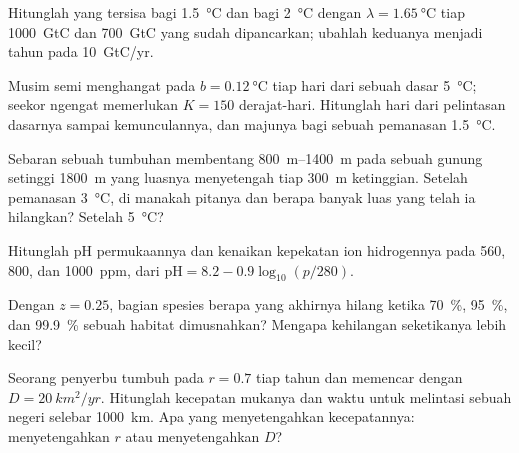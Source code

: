 \begin{exercise}[$\star\star$]\label{exo:b2:global-change:5}
Hitunglah  yang tersisa bagi \qty{1.5}{\celsius} dan
bagi \qty{2}{\celsius} dengan $\lambda = \qty{1.65}{\celsius}$ tiap
\qty{1000}{GtC} dan \qty{700}{GtC} yang sudah dipancarkan; ubahlah
keduanya menjadi tahun pada \qty{10}{GtC/yr}.
\end{exercise}

\begin{exercise}[$\star\star$]\label{exo:b2:global-change:6}
Musim semi menghangat pada $b = \qty{0.12}{\celsius}$ tiap hari dari
sebuah dasar \qty{5}{\celsius}; seekor ngengat memerlukan $K = 150$
derajat-hari. Hitunglah hari dari pelintasan dasarnya sampai
kemunculannya, dan majunya bagi sebuah pemanasan \qty{1.5}{\celsius}.
\end{exercise}

\begin{exercise}[$\star\star$]\label{exo:b2:global-change:7}
Sebaran sebuah tumbuhan membentang \qtyrange{800}{1400}{m} pada sebuah
gunung setinggi \qty{1800}{m} yang luasnya menyetengah tiap
\qty{300}{m} ketinggian. Setelah pemanasan \qty{3}{\celsius}, di
manakah pitanya dan berapa banyak luas yang telah ia hilangkan? Setelah
\qty{5}{\celsius}?
\end{exercise}

\begin{exercise}[$\star\star$]\label{exo:b2:global-change:8}
Hitunglah pH permukaannya dan kenaikan kepekatan ion hidrogennya pada
560, 800, dan \qty{1000}{ppm}, dari $\mathrm{pH} = 8.2 -
0.9\log_{10}(p/280)$.
\end{exercise}

\begin{exercise}[$\star\star$]\label{exo:b2:global-change:9}
Dengan $z = 0.25$, bagian spesies berapa yang akhirnya hilang ketika
\qty{70}{\%}, \qty{95}{\%}, dan \qty{99.9}{\%} sebuah habitat
dimusnahkan? Mengapa kehilangan seketikanya lebih kecil?
\end{exercise}

\begin{exercise}[$\star\star\star$]\label{exo:b2:global-change:10}
Seorang penyerbu tumbuh pada $r = 0.7$ tiap tahun dan memencar dengan
$D =
\qty{20}{km^2/yr}$. Hitunglah kecepatan mukanya dan waktu untuk
melintasi sebuah negeri selebar \qty{1000}{km}. Apa yang menyetengahkan
kecepatannya: menyetengahkan $r$ atau menyetengahkan $D$?
\end{exercise}

